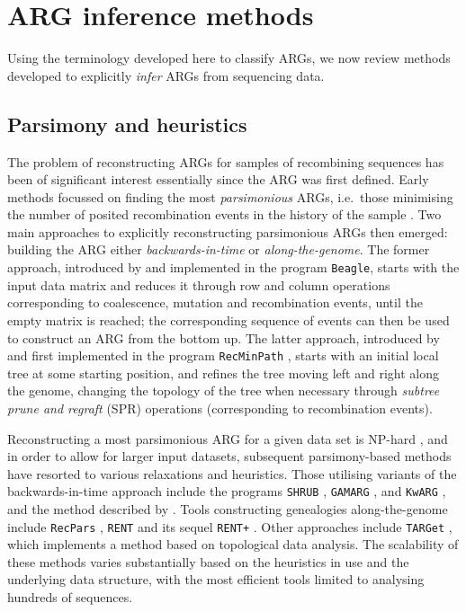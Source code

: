 \documentclass{article}
\begin{document}
\section*{ARG inference methods}
Using the terminology developed here to classify ARGs, we now review methods developed
to explicitly \emph{infer} ARGs from sequencing data.

\subsection*{Parsimony and heuristics}
The problem of reconstructing ARGs for samples of recombining sequences has been of significant
 interest essentially since the ARG was first defined. Early methods focussed on finding the most
 \emph{parsimonious} ARGs, i.e.\ those minimising the number of posited recombination events in
 the history of the sample \citep{hein1990reconstructing}. Two main approaches to explicitly reconstructing
 parsimonious ARGs then emerged: building the ARG either \emph{backwards-in-time} or \emph{along-the-genome}.
 The former approach, introduced by \citet{lyngso2005minimum} and implemented in the program
 \texttt{Beagle}, starts with the input data matrix and reduces it through row and column operations
 corresponding to coalescence, mutation and recombination events, until the empty matrix is reached;
 the corresponding sequence of events can then be used to construct an ARG from the bottom up. The
 latter approach, introduced by \citet{song2003parsimonious} and first implemented in the program
 \texttt{RecMinPath} \citep{song2005constructing}, starts with an initial local tree at some starting
 position, and refines the tree moving left and right along the genome, changing the topology of the
 tree when necessary through \emph{subtree prune and regraft} (SPR) operations (corresponding to
 recombination events).

Reconstructing a most parsimonious ARG for a given data set is NP-hard \citep{wang2001perfect},
and in order to allow for larger input datasets, subsequent parsimony-based methods have resorted
to various relaxations and heuristics. Those utilising variants of the backwards-in-time approach
include the programs \texttt{SHRUB} \citep{song2005efficient}, \texttt{GAMARG} \citep{thao2019hybrid},
and \texttt{KwARG} \citep{ignatieva2021kwarg}, and the method described by \citet{wu2008association}.
Tools constructing genealogies along-the-genome include \texttt{RecPars} \citep{hein1993heuristic},
\texttt{RENT} \citep{wu2011new} and its sequel \texttt{RENT+} \citep{mirzaei2017rent}. Other approaches
include \texttt{TARGet} \citep{camara2016inference}, which implements a method based on topological
data analysis. The scalability of these methods varies substantially based on the heuristics in use
and the underlying data structure, with the most efficient tools limited to analysing hundreds of
sequences.
\end{document}
